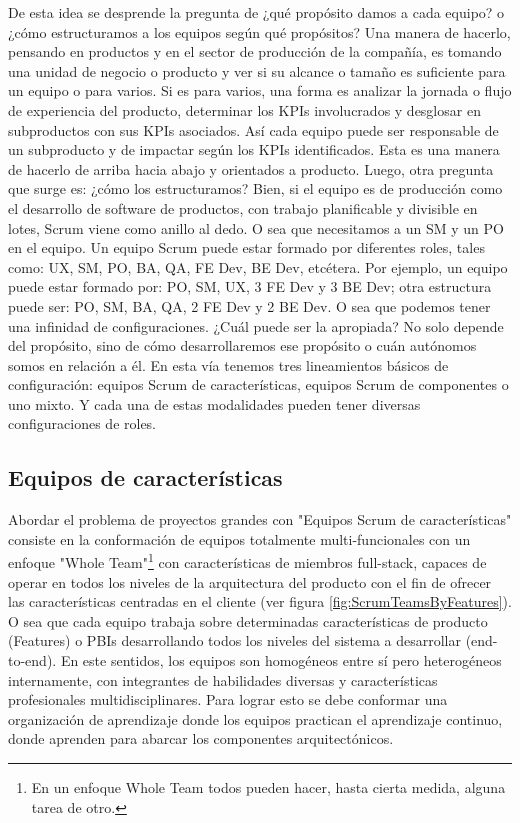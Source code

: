 De esta idea se desprende la pregunta de ¿qué propósito damos a cada equipo? o ¿cómo estructuramos a los equipos según qué propósitos? Una manera de hacerlo, pensando en productos y en el sector de producción de la compañía, es tomando una unidad de negocio o producto y ver si su alcance o tamaño es suficiente para un equipo o para varios. Si es para varios, una forma es analizar la jornada o flujo de experiencia del producto, determinar los KPIs involucrados y desglosar en subproductos con sus KPIs asociados. Así cada equipo puede ser responsable de un subproducto y de impactar según los KPIs identificados. Esta es una manera de hacerlo de arriba hacia abajo y orientados a producto. Luego, otra pregunta que surge es: ¿cómo los estructuramos? Bien, si el equipo es de producción como el desarrollo de software de productos, con trabajo planificable y divisible en lotes, Scrum viene como anillo al dedo. O sea que necesitamos a un SM y un PO en el equipo. Un equipo Scrum puede estar formado por diferentes roles, tales como: UX, SM, PO, BA, QA, FE Dev, BE Dev, etcétera. Por ejemplo, un equipo puede estar formado por: PO, SM, UX, 3 FE Dev y 3 BE Dev; otra estructura puede ser: PO, SM, BA, QA, 2 FE Dev y 2 BE Dev. O sea que podemos tener una infinidad de configuraciones. ¿Cuál puede ser la apropiada? No solo depende del propósito, sino de cómo desarrollaremos ese propósito o cuán autónomos somos en relación a él. En esta vía tenemos tres lineamientos básicos de configuración: equipos Scrum de características, equipos Scrum de componentes o uno mixto. Y cada una de estas modalidades pueden tener diversas configuraciones de roles.

\subsection{Equipos de características}

Abordar el problema de proyectos grandes con "Equipos Scrum de características" consiste en la conformación de equipos totalmente multi-funcionales con un enfoque "Whole Team"\footnote{En un enfoque Whole Team todos pueden hacer, hasta cierta medida, alguna tarea de otro\cite{Juan-Gabardini-2015}.} con características de miembros full-stack, capaces de operar en todos los niveles de la arquitectura del producto con el fin de ofrecer las características centradas en el cliente (ver figura \ref{fig:ScrumTeamsByFeatures}). O sea que cada equipo trabaja sobre determinadas características de producto (Features) o PBIs desarrollando todos los niveles del sistema a desarrollar (end-to-end). En este sentidos, los equipos son homogéneos entre sí pero heterogéneos internamente, con integrantes de habilidades diversas y características profesionales multidisciplinares. Para lograr esto se debe conformar una organización de aprendizaje donde los equipos practican el aprendizaje continuo, donde aprenden para abarcar los componentes arquitectónicos.

